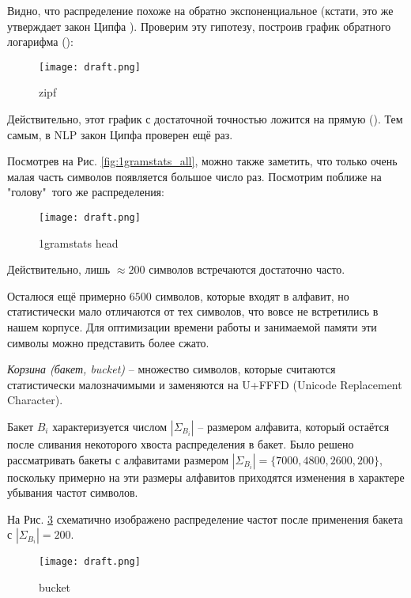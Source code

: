Видно, что распределение похоже на обратно экспоненциальное (кстати, это же утверждает закон Ципфа ). Проверим эту гипотезу, построив график обратного логарифма ():

\begin{figure}[H]
	\centering
	\texttt{[image: draft.png]}
	\caption{zipf}
	\label{fig:zipf1gram}
\end{figure}

Действительно, этот график с достаточной точностью ложится на прямую (). Тем самым, в NLP закон Ципфа проверен ещё раз.

Посмотрев на Рис. \ref{fig:1gramstats_all}, можно также заметить, что только очень малая часть символов появляется большое число раз. Посмотрим поближе на "голову"\ того же распределения:

\begin{figure}[H]
	\centering
	\texttt{[image: draft.png]}
	\caption{1gramstats head}
	\label{fig:gramstats_head}
\end{figure}

Действительно, лишь $\approx 200$ символов встречаются достаточно часто.

Осталюся ещё примерно $6500$ символов, которые входят в алфавит, но статистически мало отличаются от тех символов, что вовсе не встретились в нашем корпусе. Для оптимизации времени работы и занимаемой памяти эти символы можно представить более сжато.

\begin{definition}
	{\textit{Корзина (бакет, bucket)}} -- множество символов, которые считаются статистически малозначимыми и заменяются на U+FFFD (Unicode Replacement Character).
\end{definition}

Бакет $B_i$ характеризуется числом $|\Sigma_{B_i}|$ -- размером алфавита, который остаётся после сливания некоторого хвоста распределения в бакет. Было решено рассматривать бакеты с алфавитами размером $|\Sigma_{B_i}| = \{ 7000, 4800, 2600, 200 \}$, поскольку примерно на эти размеры алфавитов приходятся изменения в характере убывания частот символов.

На Рис. \ref{fig:bucket_pic} схематично изображено распределение частот после применения бакета с $|\Sigma_{B_i}| = 200$.

\begin{figure}[H]
	\centering
	\texttt{[image: draft.png]}
	\caption{bucket}
	\label{fig:bucket_pic}
\end{figure}

